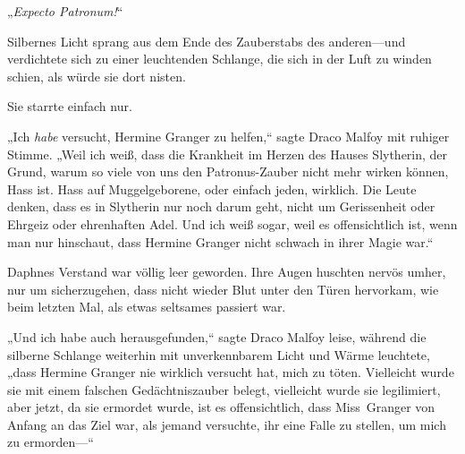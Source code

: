 „\emph{Expecto Patronum!}“

Silbernes Licht sprang aus dem Ende des Zauberstabs des anderen—und verdichtete sich zu einer leuchtenden Schlange, die sich in der Luft zu winden schien, als würde sie dort nisten.

Sie starrte einfach nur.

„Ich \emph{habe} versucht, Hermine Granger zu helfen,“ sagte Draco Malfoy mit ruhiger Stimme. „Weil ich weiß, dass die Krankheit im Herzen des Hauses Slytherin, der Grund, warum so viele von uns den Patronus-Zauber nicht mehr wirken können, Hass ist. Hass auf Muggelgeborene, oder einfach jeden, wirklich. Die Leute denken, dass es in Slytherin nur noch darum geht, nicht um Gerissenheit oder Ehrgeiz oder ehrenhaften Adel. Und ich weiß sogar, weil es offensichtlich ist, wenn man nur hinschaut, dass Hermine Granger nicht schwach in ihrer Magie war.“

Daphnes Verstand war völlig leer geworden. Ihre Augen huschten nervös umher, nur um sicherzugehen, dass nicht wieder Blut unter den Türen hervorkam, wie beim letzten Mal, als etwas seltsames passiert war.

„Und ich habe auch herausgefunden,“ sagte Draco Malfoy leise, während die silberne Schlange weiterhin mit unverkennbarem Licht und Wärme leuchtete, „dass Hermine Granger nie wirklich versucht hat, mich zu töten. Vielleicht wurde sie mit einem falschen Gedächtniszauber belegt, vielleicht wurde sie legilimiert, aber jetzt, da sie ermordet wurde, ist es offensichtlich, dass Miss~Granger von Anfang an das Ziel war, als jemand versuchte, ihr eine Falle zu stellen, um mich zu ermorden—“

